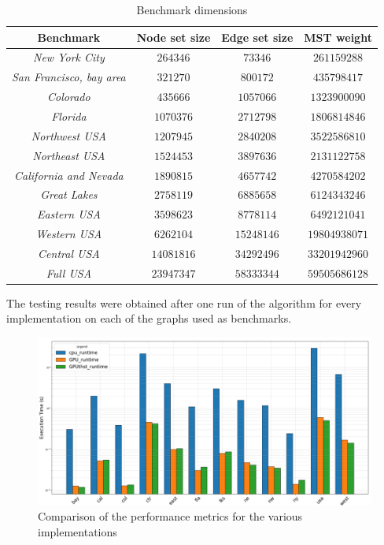 \documentclass[a4paper,10pt]{article}
\begin{document}
\begin{longtable}{|c|c|c|c|}
	\caption{Benchmark dimensions}\label{tbl:benchmarks}
	\\\hline\textbf{Benchmark} & \textbf{Node set size} & \textbf{Edge set size} & \textbf{MST weight} \\\hline\hline
	\endfirsthead\hline\endlastfoot

	\textit{New York City}           & $\num{264346}$   & $\num{73346}$    & $\num{261159288}$   \\\hline
	\textit{San Francisco, bay area} & $\num{321270}$   & $\num{800172}$   & $\num{435798417}$   \\\hline
	\textit{Colorado}                & $\num{435666}$   & $\num{1057066}$  & $\num{1323900090}$  \\\hline
	\textit{Florida}                 & $\num{1070376}$  & $\num{2712798}$  & $\num{1806814846}$  \\\hline
	\textit{Northwest USA}           & $\num{1207945}$  & $\num{2840208}$  & $\num{3522586810}$  \\\hline
	\textit{Northeast USA}           & $\num{1524453}$  & $\num{3897636}$  & $\num{2131122758}$  \\\hline
	\textit{California and Nevada}   & $\num{1890815}$  & $\num{4657742}$  & $\num{4270584202}$  \\\hline
	\textit{Great Lakes}             & $\num{2758119}$  & $\num{6885658}$  & $\num{6124343246}$  \\\hline
	\textit{Eastern USA}             & $\num{3598623}$  & $\num{8778114}$  & $\num{6492121041}$  \\\hline
	\textit{Western USA}             & $\num{6262104}$  & $\num{15248146}$ & $\num{19804938071}$ \\\hline
	\textit{Central USA}             & $\num{14081816}$ & $\num{34292496}$ & $\num{33201942960}$ \\\hline
	\textit{Full USA}                & $\num{23947347}$ & $\num{58333344}$ & $\num{59505686128}$ \\\hline
\end{longtable}
The testing results were obtained after one run of the algorithm for every implementation on each of
the graphs used as benchmarks.
\begin{figure}
	\centering
	\includegraphics[scale=0.3]{fig/benchmarks.png}
	\caption{Comparison of the performance metrics for the various implementations}
	\label{fig:results}
\end{figure}
\end{document}
